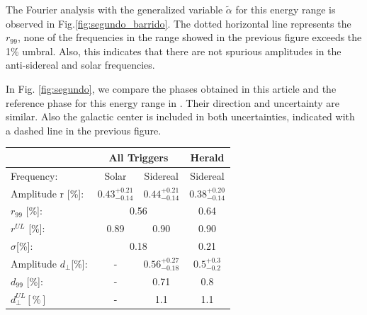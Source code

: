 \documentclass[12pt, doublespace, oneside]{article}
\begin{document}
The Fourier analysis with the generalized variable $\tilde{\alpha}$ for this energy range is observed in Fig.\ref{fig:segundo_barrido}. The dotted horizontal line represents the $r_{99}$, none of the frequencies in the range showed in the previous figure exceeds the 1\% umbral. Also, this indicates that there are not spurious amplitudes in the anti-sidereal and solar frequencies.

In Fig. \ref{fig:segundo},  we compare the phases obtained in this article and the reference phase for this energy range in \cite{Aab_2020}. Their direction and uncertainty are similar. Also the galactic center is included in both uncertainties, indicated with a dashed line in the previous figure.

    \begin{table}[H]
        \vspace*{-0.8 cm}
        \begin{small}
            \begin{center}
                \begin{tabular}[c]{l|c|c||c|}
\cline{2-4}                                       & \multicolumn{2}{c||}{All Triggers}    & \multicolumn{1}{c|}{Herald  }   \\ \hline
\multicolumn{1}{|l|}{Frequency:                } & Solar	                & Sidereal	                 & Sidereal \cite{Aab_2020}   \\ \hline
\multicolumn{1}{|l|}{Amplitude r [\%]:           } & $0.43^{+0.21}_{-0.14}$	& $0.44^{+0.21}_{-0.14}$ 	& $0.38^{+0.20}_{-0.14}$ \cite{codigo}      \\
\multicolumn{1}{|l|}{$r_{99}$ [\%]:             } & \multicolumn{2}{c||}{0.56}                          & 0.64\cite{codigo}                 \\
\multicolumn{1}{|l|}{$r^{UL}$ [\%]:             } & 0.89 	                & 0.90                      & 0.90 \cite{codigo}                 \\ 
\multicolumn{1}{|l|}{$\sigma$[\%]:              } & \multicolumn{2}{c||}{0.18}                          & 0.21 \cite{codigo}      \\\hline
\multicolumn{1}{|l|}{Amplitude $d_\perp$[\%]:    } & -	                    & $0.56^{+0.27}_{-0.18}$ 	& $0.5^{+0.3}_{-0.2}$       \\
\multicolumn{1}{|l|}{$d_{99}$ [\%]:             } & - 	                    & 0.71                      & 0.8   \cite{codigo}                \\
\multicolumn{1}{|l|}{$d_{\perp}^{UL}[\%]$       } & -                       & 1.1                       & 1.1                         \\

\end{tabular}
\end{center}
\end{small}
\end{table}
\end{document}
